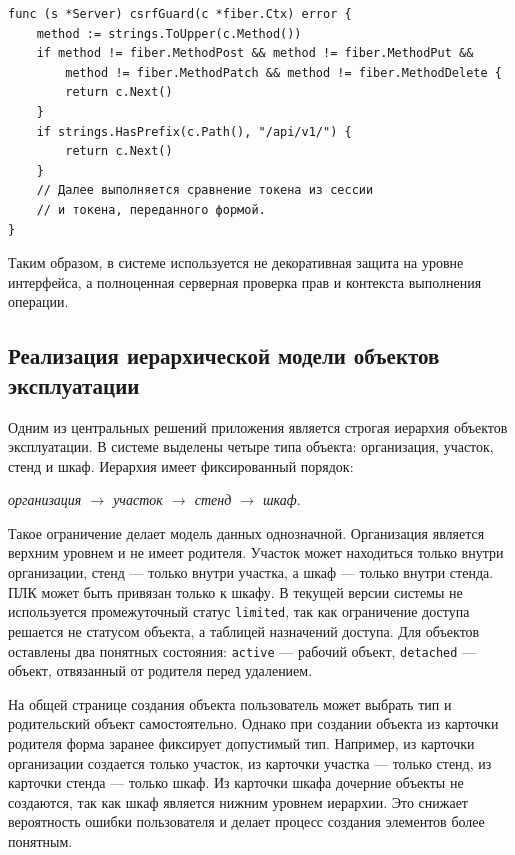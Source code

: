 \begin{samepage}
\begin{lstlisting}[caption={Проверка CSRF-токена для изменяющих запросов}, label={lst:chapter3_csrf}]
func (s *Server) csrfGuard(c *fiber.Ctx) error {
    method := strings.ToUpper(c.Method())
    if method != fiber.MethodPost && method != fiber.MethodPut &&
        method != fiber.MethodPatch && method != fiber.MethodDelete {
        return c.Next()
    }
    if strings.HasPrefix(c.Path(), "/api/v1/") {
        return c.Next()
    }
    // Далее выполняется сравнение токена из сессии
    // и токена, переданного формой.
}
\end{lstlisting}
\end{samepage}

Таким образом, в системе используется не декоративная защита на уровне интерфейса, а полноценная серверная проверка прав и контекста выполнения операции.


\subsection{Реализация иерархической модели объектов эксплуатации}

Одним из центральных решений приложения является строгая иерархия объектов эксплуатации. В системе выделены четыре типа объекта: организация, участок, стенд и шкаф. Иерархия имеет фиксированный порядок:

\begin{center}
    \textit{организация $\rightarrow$ участок $\rightarrow$ стенд $\rightarrow$ шкаф}.
\end{center}

Такое ограничение делает модель данных однозначной. Организация является верхним уровнем и не имеет родителя. Участок может находиться только внутри организации, стенд --- только внутри участка, а шкаф --- только внутри стенда. ПЛК может быть привязан только к шкафу. В текущей версии системы не используется промежуточный статус \texttt{limited}, так как ограничение доступа решается не статусом объекта, а таблицей назначений доступа. Для объектов оставлены два понятных состояния: \texttt{active} --- рабочий объект, \texttt{detached} --- объект, отвязанный от родителя перед удалением.

На общей странице создания объекта пользователь может выбрать тип и родительский объект самостоятельно. Однако при создании объекта из карточки родителя форма заранее фиксирует допустимый тип. Например, из карточки организации создается только участок, из карточки участка --- только стенд, из карточки стенда --- только шкаф. Из карточки шкафа дочерние объекты не создаются, так как шкаф является нижним уровнем иерархии. Это снижает вероятность ошибки пользователя и делает процесс создания элементов более понятным.

